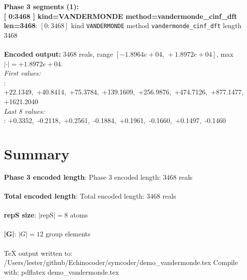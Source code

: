 \documentclass[a4paper,11pt]{article}
\begin{document}
\textbf{Phase 3 segments (1):}\\
\textbf{    [    0:3468 ]  kind=VANDERMONDE  method=vandermonde\_cinf\_dft  len=3468}: $[0{:}3468]$  kind \texttt{VANDERMONDE}  method \texttt{vandermonde\_cinf\_dft}  length $3468$\\\\

\textbf{Encoded output:} $3468$ reals, range $[-1.8964e+04,\ +1.8972e+04]$, max$|\cdot| = +1.8972e+04$.\\
\textit{First values:}\\
\textbf{    }: +22.1349,\ +40.8414,\ +75.3784,\ +139.1609,\ +256.9876,\ +474.7126,\ +877.1477,\ +1621.2040\\
\textit{Last 8 values:}\\
\textbf{    }: +0.3352,\ -0.2118,\ +0.2561,\ -0.1884,\ +0.1961,\ -0.1660,\ +0.1497,\ -0.1460\\

\section{Summary}
\textbf{  Phase 3 encoded length}: Phase 3 encoded length: $3468$ reals\\\\
\textbf{  Total encoded length}: Total encoded length: $3468$ reals\\\\
\textbf{  repS size}: $|\text{repS}| = 8$ atoms\\\\
\textbf{  |G|}: $|G| = 12$ group elements\\\\

  TeX output written to: /Users/lester/github/Echinocoder/symcoder/demo\_vandermonde.tex
  Compile with:  pdflatex demo\_vandermonde.tex
\end{document}

